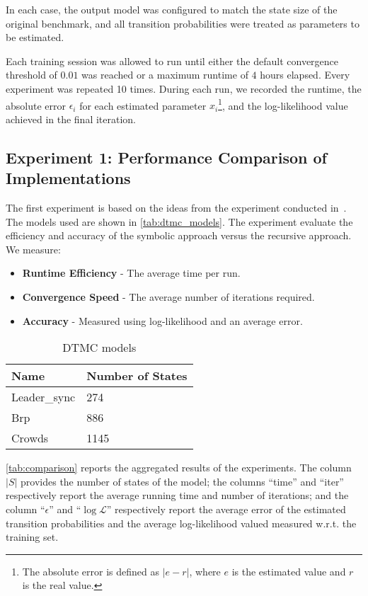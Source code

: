 In each case, the output model was configured to match the state size of the original benchmark, and all transition probabilities were treated as parameters to be estimated.

Each training session was allowed to run until either the default convergence threshold of $0.01$ was reached or a maximum runtime of $4$ hours elapsed.
Every experiment was repeated 10 times. During each run, we recorded the runtime, the absolute error $\epsilon_i$ for each estimated parameter $x_i$\footnote{The absolute error is defined as $|e - r|$, where $e$ is the estimated value and $r$ is the real value.}, and the log-likelihood value achieved in the final iteration.

\subsection{Experiment 1: Performance Comparison of Implementations}
The first experiment is based on the ideas from the experiment conducted in~\cite{reynouard2024learning}.
The models used are shown in \autoref{tab:dtmc_models}.
The experiment evaluate the efficiency and accuracy of the symbolic approach versus the recursive approach.
We measure:
\begin{itemize}
    \item \textbf{Runtime Efficiency} - The average time per run.
    \item \textbf{Convergence Speed} - The average number of iterations required.
    \item \textbf{Accuracy} - Measured using log-likelihood and an average error.
\end{itemize}

\begin{table}[!htb]
    \centering
    \caption{DTMC models}
    \label{tab:dtmc_models}
    \begin{tabular}{ll}
        \toprule
        Name         & Number of States \\
        \midrule
        Leader\_sync & 274              \\
        Brp          & 886              \\
        Crowds       & 1145             \\
        \bottomrule
    \end{tabular}
\end{table}

\autoref{tab:comparison} reports the aggregated results of the experiments. The column $|S|$ provides the number of states of the model; the columns ``time'' and ``iter'' respectively report the average running time and number of iterations; and the column ``$\epsilon$'' and ``$\log \mathcal{L}$'' respectively report the average error of the estimated transition probabilities and the average log-likelihood valued measured w.r.t. the training set.


